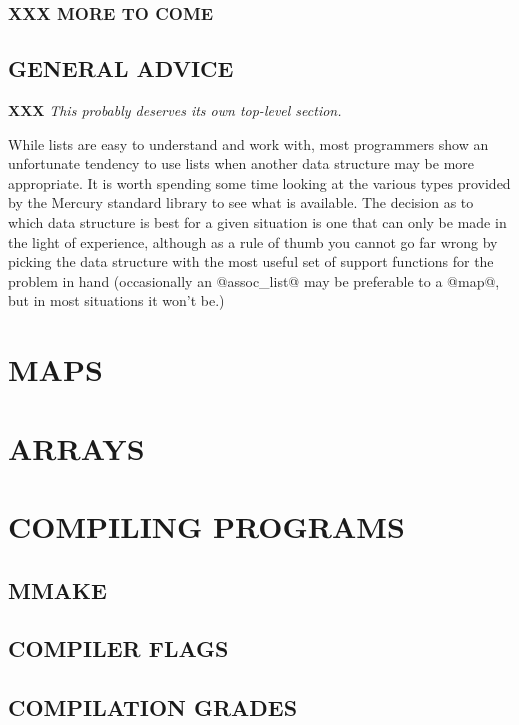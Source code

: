 \documentclass[a4paper,11pt,notitlepage,onecolumn]{article}
\newcommand{\XXX}[1]%
{{\small\textbf{XXX} \emph{#1}}}
\begin{document}
\subsubsection{XXX MORE TO COME}

\subsection{GENERAL ADVICE}

\XXX{This probably deserves its own top-level section.}

While lists are easy to understand and work with, most programmers show
an unfortunate tendency to use lists when another data structure may be
more appropriate.  It is worth spending some time looking at the various
types provided by the Mercury standard library to see what is available.
The decision as to which data structure is best for a given situation is
one that can only be made in the light of experience, although as a rule
of thumb you cannot go far wrong by picking the data structure with the
most useful set of support functions for the problem in hand
(occasionally an @assoc_list@ may be preferable to a @map@, but in most
situations it won't be.)

\section{MAPS}



\section{ARRAYS}



\section{COMPILING PROGRAMS}
\subsection{MMAKE}
\subsection{COMPILER FLAGS}
\subsection{COMPILATION GRADES}
\end{document}
